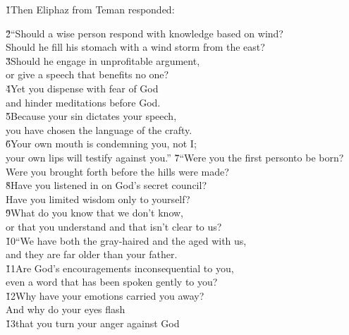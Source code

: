 \v{1}Then Eliphaz from Teman responded:

\begin{poetry}
\poeml \v{2}``Should a wise person respond with knowledge based on wind? \\
\poemll    Should he fill his stomach with a wind storm from the east? \\
\poeml \v{3}Should he engage in unprofitable argument, \\
\poemll    or give a speech that benefits no one? \\
\poeml \v{4}Yet you dispense with fear of God \\
\poemll    and hinder meditations before God. \\
\poeml \v{5}Because your sin dictates your speech, \\
\poemll    you have chosen the language of the crafty. \\
\poeml \v{6}Your own mouth is condemning you, not I; \\
\poemll    your own lips will testify against you.''
\poeml \v{7}``Were you the first personto be born? \\
\poemll    Were you brought forth before the hills were made? \\
\poeml \v{8}Have you listened in on God's secret council? \\
\poemll    Have you limited wisdom only to yourself? \\
\poeml \v{9}What do you know that we don't know, \\
\poemll    or that you understand and that isn't clear to us? \\
\poeml \v{10}``We have both the gray-haired and the aged with us, \\
\poemll    and they are far older than your father. \\
\poeml \v{11}Are God's encouragements inconsequential to you, \\
\poemll    even a word that has been spoken gently to you? \\
\poeml \v{12}Why have your emotions carried you away? \\
\poemll    And why do your eyes flash \\
\poeml \v{13}that you turn your anger against God \\

\end{poetry}
